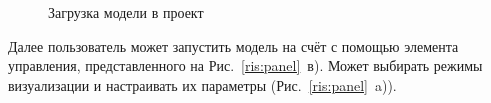 \documentclass[a4paper,12pt]{extarticle}
\begin{document}
\begin{figure}[h]
    \begin{minipage}[h]{0.5\linewidth}
    \end{minipage}
    \hfill
    \begin{minipage}[h]{0.5\linewidth}
    \end{minipage}
    \caption{Загрузка модели в проект}
    \label{ris:load_model}
\end{figure}

Далее пользователь может запустить модель на счёт с помощью элемента управления, представленного на Рис.~\ref{ris:panel}~в). Может выбирать режимы визуализации и настраивать их параметры (Рис.~\ref{ris:panel}~a)).
\end{document}

